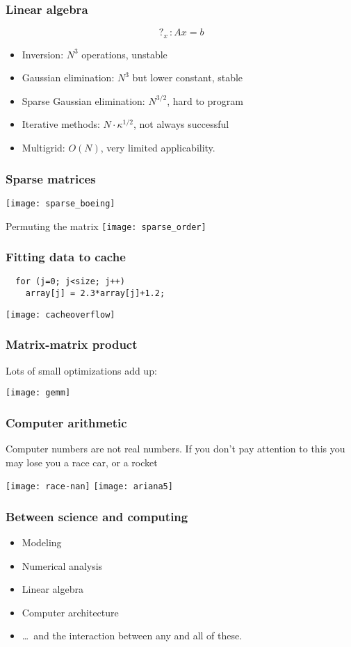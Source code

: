 \documentclass[11pt,headernav]{beamer}
\begin{document}

\begin{frame}\frametitle{Linear algebra}
  \[\mathop{?}_x\colon Ax=b\]
  \begin{itemize}
  \item Inversion: $N^3$ operations, unstable
  \item Gaussian elimination: $N^3$ but lower constant, stable
  \item Sparse Gaussian elimination: $N^{3/2}$, hard to program
  \item Iterative methods: $N\cdot \kappa^{1/2}$, not always successful
  \item Multigrid: $O(N)$, very limited applicability.
  \end{itemize}
\end{frame}

\begin{frame}\frametitle{Sparse matrices}
  \texttt{[image: sparse\_boeing]}
\end{frame}

\begin{frame}{Permuting the matrix}
  \texttt{[image: sparse\_order]}
\end{frame}


\begin{frame}[containsverbatim]\frametitle{Fitting data to cache}
\begin{verbatim}
  for (j=0; j<size; j++)
    array[j] = 2.3*array[j]+1.2;
\end{verbatim}
  \texttt{[image: cacheoverflow]}
\end{frame}

\begin{frame}\frametitle{Matrix-matrix product}
  Lots of small optimizations add up:

  \texttt{[image: gemm]}
\end{frame}

\begin{frame}\frametitle{Computer arithmetic}
    Computer numbers are not real numbers. If you don't pay attention
    to this you may lose you a race car, or a rocket
  \begin{multicols}{2}
    \texttt{[image: race-nan]}
    \vfill\columnbreak
    \texttt{[image: ariana5]}
  \end{multicols}
\end{frame}


\begin{frame}\frametitle{Between science and computing}
  \begin{itemize}
  \item Modeling
  \item Numerical analysis
  \item Linear algebra
  \item Computer architecture
  \item \ldots~and the interaction between any and all of these.
  \end{itemize}
\end{frame}
\end{document}
